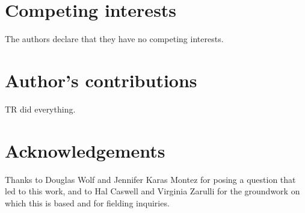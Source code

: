 \documentclass{bmcart}
\begin{document}


\begin{backmatter}

\section*{Competing interests}
  The authors declare that they have no competing interests.

\section*{Author's contributions}
    TR did everything.

\section*{Acknowledgements}
  Thanks to Douglas Wolf and Jennifer Karas Montez for posing a question that led to this work, and to Hal Caswell and Virginia Zarulli for the groundwork on which this is based and for fielding inquiries.



\end{backmatter}
\end{document}
